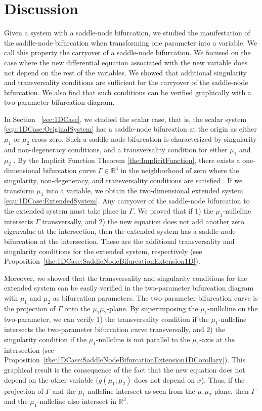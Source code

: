 \documentclass[12pt]{article}
\begin{document}
\section{Discussion}
\label{sec:Discussion}

Given a system with a saddle-node bifurcation, we studied the manifestation of the saddle-node bifurcation when transforming one parameter into a variable. We call this property the carryover of a saddle-node bifurcation. We focused on the case where the new differential equation associated with the new variable does not depend on the rest of the variables. We showed that additional singularity and transversality conditions are sufficient for the carryover of the saddle-node bifurcation. We also find that such conditions can be verified graphically with a two-parameter bifurcation diagram.

In Section ~\ref{sec:1DCase}, we studied the scalar case, that is, the scalar system \eqref{equ:1DCase:OriginalSystem} has a saddle-node bifurcation at the origin as either $\mu_{1}$ or $\mu_{2}$ cross zero. Such a saddle-node bifurcation is characterized by singularity and non-degeneracy conditions, and a transversality condition for either $\mu_{1}$ and $\mu_{2}$ \citep{Meiss2007}. By the Implicit Function Theorem \ref{the:ImplicitFunction}, there exists a one-dimensional bifurcation curve $\Gamma\in\mathbb{R}^{3}$ in the neighborhood of zero where the singularity, non-degeneracy, and transversality conditions are satisfied \citep{Kuznetsov2004}. If we transform $\mu_{1}$ into a variable, we obtain the two-dimensional extended system \eqref{equ:1DCase:ExtendedSystem}. Any carryover of the saddle-node bifurcation to the extended system must take place in $\Gamma$. We proved that if 1) the $\mu_{1}$-nullcline intersects $\Gamma$ transversally, and 2) the new equation does not add another zero eigenvalue at the intersection, then the extended system has a saddle-node bifurcation at the intersection. These are the additional transversality and singularity conditions for the extended system, respectively (see Proposition~\ref{the:1DCase:SaddleNodeBifurcationExtension1D}).

Moreover, we showed that the transversality and singularity conditions for the extended system can be easily verified in the two-parameter bifurcation diagram with $\mu_{1}$ and $\mu_{2}$ as bifurcation parameters. The two-parameter bifurcation curve is the projection of $\Gamma$ onto the $\mu_{1}\mu_{2}$-plane. By superimposing the $\mu_{1}$-nullcline on the two-parameter, we can verify 1) the transversality condition if the $\mu_{1}$-nullcline intersects the two-parameter bifurcation curve transversally, and 2) the singularity condition if the $\mu_{1}$-nullcline is not parallel to the $\mu_{1}$-axis at the intersection (see Proposition~\ref{the:1DCase:SaddleNodeBifurcationExtension1DCorollary}). This graphical result is the consequence of the fact that the new equation does not depend on the other variable ($g(\mu_{1}; \mu_{2})$ does not depend on $x$). Thus, if the projection of $\Gamma$ and the $\mu_{1}$-nullcline intersect as seen from the $\mu_{1}\mu_{2}$-plane, then $\Gamma$ and the $\mu_{1}$-nullcline also intersect in $\mathbb{R}^{3}$.
\end{document}
